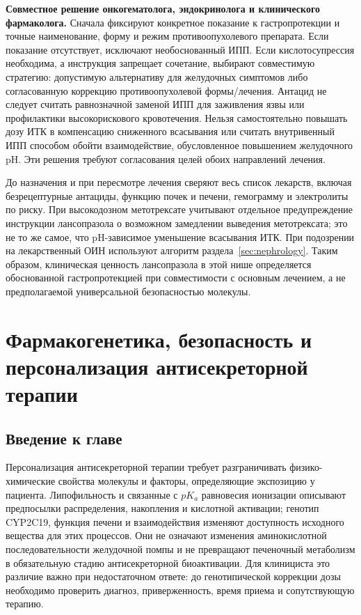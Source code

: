 \documentclass[11pt,a4paper,notitlepage]{report}
\newcommand{\src}[1]{\unskip\space\cite{#1}}
\begin{document}
\textbf{Совместное решение онкогематолога, эндокринолога и клинического фармаколога.} Сначала фиксируют конкретное показание к гастропротекции и точные наименование, форму и режим противоопухолевого препарата. Если показание отсутствует, исключают необоснованный ИПП. Если кислотосупрессия необходима, а инструкция запрещает сочетание, выбирают совместимую стратегию: допустимую альтернативу для желудочных симптомов либо согласованную коррекцию противоопухолевой формы/лечения. Антацид не следует считать равнозначной заменой ИПП для заживления язвы или профилактики высокорискового кровотечения. Нельзя самостоятельно повышать дозу ИТК в компенсацию сниженного всасывания или считать внутривенный ИПП способом обойти взаимодействие, обусловленное повышением желудочного pH. Эти решения требуют согласования целей обоих направлений лечения.\src{oncobosulif2026,oncodasatinib2026,oncocalcaps2026,oncocaltablet2026,oncophyrago2024,oncoppiposition2016}

До назначения и при пересмотре лечения сверяют весь список лекарств, включая безрецептурные антациды, функцию почек и печени, гемограмму и электролиты по риску. При высокодозном метотрексате учитывают отдельное предупреждение инструкции лансопразола о возможном замедлении выведения метотрексата; это не то же самое, что pH-зависимое уменьшение всасывания ИТК. При подозрении на лекарственный ОИН используют алгоритм раздела~\ref{sec:nephrology}. Таким образом, клиническая ценность лансопразола в этой нише определяется обоснованной гастропротекцией при совместимости с основным лечением, а не предполагаемой универсальной безопасностью молекулы.\src{uslabel,oncobosulif2026,oncocaltablet2026}

\chapter{Фармакогенетика, безопасность и персонализация антисекреторной терапии}
\label{chap:personalization}

\section*{Введение к главе}
Персонализация антисекреторной терапии требует разграничивать физико-химические свойства молекулы и факторы, определяющие экспозицию у пациента. Липофильность и связанные с $pK_a$ равновесия ионизации описывают предпосылки распределения, накопления и кислотной активации; генотип CYP2C19, функция печени и взаимодействия изменяют доступность исходного вещества для этих процессов. Они не означают изменения аминокислотной последовательности желудочной помпы и не превращают печеночный метаболизм в обязательную стадию антисекреторной биоактивации. Для клинициста это различие важно при недостаточном ответе: до генотипической коррекции дозы необходимо проверить диагноз, приверженность, время приема и сопутствующую терапию.\src{molchem,molp450,cpic,uslabel,agagerd}
\end{document}
